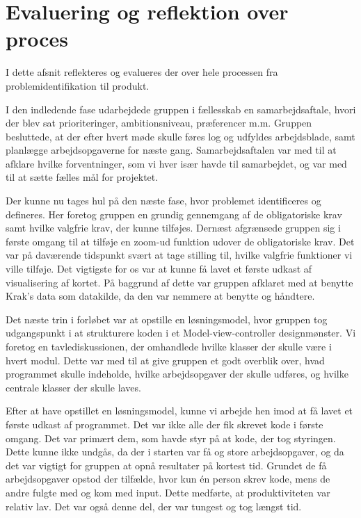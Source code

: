 \section{Evaluering og reflektion over proces}
\label{sec:evaluering_og_reflektion_over_proces}

I dette afsnit reflekteres og evalueres der over hele processen fra problemidentifikation til produkt. 

I den indledende fase udarbejdede gruppen i fællesskab en samarbejdsaftale, hvori der blev sat prioriteringer, ambitionsniveau, præferencer m.m. Gruppen besluttede, at der efter hvert møde skulle føres log og udfyldes arbejdsblade, samt planlægge arbejdsopgaverne for næste gang. Samarbejdsaftalen var med til at afklare hvilke forventninger, som vi hver især havde til samarbejdet, og var med til at sætte fælles mål for projektet.

Der kunne nu tages hul på den næste fase, hvor problemet identificeres og defineres. Her foretog gruppen en grundig gennemgang af de obligatoriske krav samt hvilke valgfrie krav, der kunne tilføjes. Dernæst afgrænsede gruppen sig i første omgang til at tilføje en zoom-ud funktion udover de obligatoriske krav. Det var på daværende tidspunkt svært at tage stilling til, hvilke valgfrie funktioner vi ville tilføje. Det vigtigste for os var at kunne få lavet et første udkast af visualisering af kortet. På baggrund af dette var gruppen afklaret med at benytte Krak's data som datakilde, da den var nemmere at benytte og håndtere.   

Det næste trin i forløbet var at opstille en løsningsmodel, hvor gruppen tog udgangspunkt i at strukturere koden i et Model-view-controller designmønster. Vi foretog en tavlediskussionen, der omhandlede hvilke klasser der skulle være i hvert modul. Dette var med til at give gruppen et godt overblik over, hvad programmet skulle indeholde, hvilke arbejdsopgaver der skulle udføres, og hvilke centrale klasser der skulle laves. 

Efter at have opstillet en løsningsmodel, kunne vi arbejde hen imod at få lavet et første udkast af programmet. Det var ikke alle der fik skrevet kode i første omgang. Det var primært dem, som havde styr på at kode, der tog styringen. Dette kunne ikke undgås, da der i starten var få og store arbejdsopgaver, og da det var vigtigt for gruppen at opnå resultater på kortest tid. Grundet de få arbejdsopgaver opstod der tilfælde, hvor kun én person skrev kode, mens de andre fulgte med og kom med input. Dette medførte, at produktiviteten var relativ lav. Det var også denne del, der var tungest og tog længst tid. 

